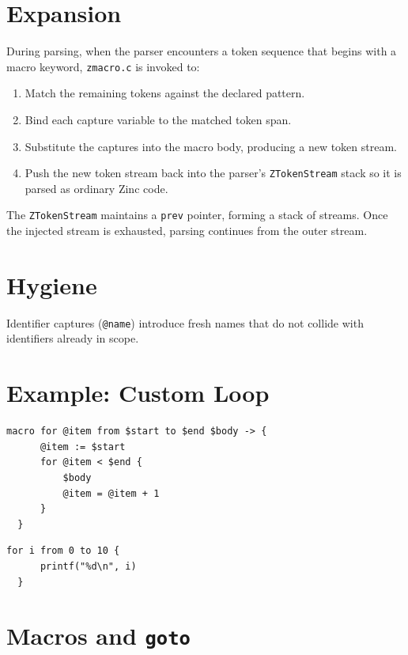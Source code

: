 \section{Expansion}

During parsing, when the parser encounters a token sequence that begins with a macro keyword, \texttt{zmacro.c} is invoked to:

\begin{enumerate}
  \item Match the remaining tokens against the declared pattern.
  \item Bind each capture variable to the matched token span.
  \item Substitute the captures into the macro body, producing a new token stream.
  \item Push the new token stream back into the parser's \texttt{ZTokenStream} stack so it is parsed as ordinary Zinc code.
\end{enumerate}

The \texttt{ZTokenStream} maintains a \texttt{prev} pointer, forming a stack of streams.
Once the injected stream is exhausted, parsing continues from the outer stream.

\section{Hygiene}

Identifier captures (\texttt{@name}) introduce fresh names that do not collide with identifiers already in scope.


\section{Example: Custom Loop}

\begin{lstlisting}[style=zinc, caption={A range-based \texttt{for} macro}]
  macro for @item from $start to $end $body -> {
      @item := $start
      for @item < $end {
          $body
          @item = @item + 1
      }
  }
\end{lstlisting}

\begin{lstlisting}[style=zinc, caption={Usage}]
  for i from 0 to 10 {
      printf("%d\n", i)
  }
\end{lstlisting}

\section{Macros and \texttt{goto}}


